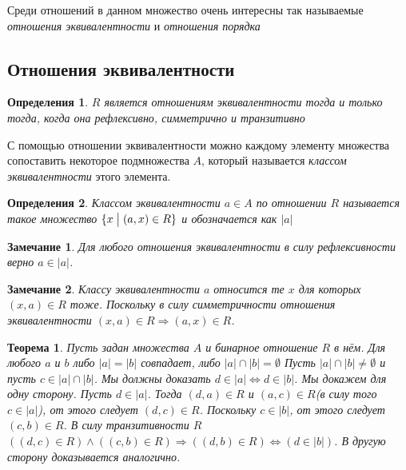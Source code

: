 \documentclass[a4paper, 16pt, oneside]{book}
\newtheorem{Definition}{Определения}[theorem]
\newtheorem{Note}{Замечание}[theorem]
\newtheorem{Theorem}{Теорема}[theorem]
\begin{document}
\par Среди отношений в данном множество очень интересны так называемые \textit{отношения эквивалентности} и \textit{отношения порядка}

\subsection{Отношения эквивалентности}

\begin{Definition}
	\label{definiton:equivalence_relation}
	\(R\) является отношениям эквивалентности тогда и только тогда, когда она рефлексивно, симметрично и транзитивно
\end{Definition}

\par С помощью отношении эквивалентности можно каждому элементу множества сопоставить некоторое подмножества \(A\),
который называется \textit{классом эквивалентности} этого элемента.

\begin{Definition}
	\label{definiton:equivalence_class}
	Классом эквивалентности \(a \in A\) по отношении \(R\) называется такое множество \(\{x \bigm| (a, x) \in R\}\)
	и обозначается как \(\left|a\right|\)
\end{Definition}

\begin{Note}
	\label{note:equivalence_class_reflection}
	Для любого отношения эквивалентности в силу рефлексивности верно \(a \in \left|a\right|\).
\end{Note}

\begin{Note}
	\label{note:equivalence_class_symmetric}
	Классу эквивалентности \(a\) относится те \(x\) для которых \((x, a) \in R\) тоже.
	Поскольку в силу симметричности отношения эквивалентности \((x, a) \in R \Rightarrow (a ,x) \in R\).
\end{Note}

\begin{Theorem}
	\label{theorem:equivalence_class_of_two_elements}
	Пусть задан множества \(A\) и бинарное отношение \(R\) в нём.
	Для любого \(a\) и \(b\) либо \(\left|a\right|=\left|b\right|\) совпадает,
	либо \(\left|a\right| \cap \left|b\right| = \emptyset\)
	\proof
	Пусть \(\left|a\right| \cap \left|b\right| \ne \emptyset\) и
	пусть \(c \in \left|a\right| \cap \left|b\right|\).
	Мы должны доказать \(d \in \left|a\right| \Leftrightarrow d \in \left|b\right|\).
	Мы докажем для одну сторону. Пусть \(d \in \left|a\right|\).
	Тогда \((d, a) \in R\) и \((a, c) \in R\)(в силу того \(c \in \left|a\right|\)),
	от этого следует \((d, c) \in R\).
	Поскольку \(c \in \left|b\right|\), от этого следует \((c, b) \in R\).
	В силу транзитивности \(R\) \(((d, c) \in R) \land ((c, b) \in R) \Rightarrow ((d, b) \in R) \Leftrightarrow (d \in \left|b\right|)\). 
	В другую сторону доказывается аналогично.
	\qedsymbol
\end{Theorem}
\end{document}
